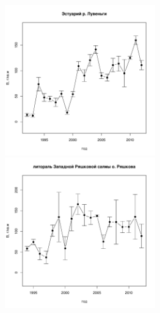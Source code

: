 \documentclass[12pt, a4paper]{article}
\begin{document}
\begin{figure}[h]
\begin{minipage}[b]{.46\linewidth}
\begin{center}
\includegraphics[width=65mm]{../White_Sea/Estuatiy_Luvenga/B_count_dynamic.pdf}
\end{center}
\end{minipage}
%
\hfil %
%
\begin{minipage}[b]{.46\linewidth}
\begin{center}
\includegraphics[width=65mm]{../White_Sea/Ryashkov_ZRS/B_count_dynamic.pdf}
\end{center}
\end{minipage}



\end{figure}
\end{document}
